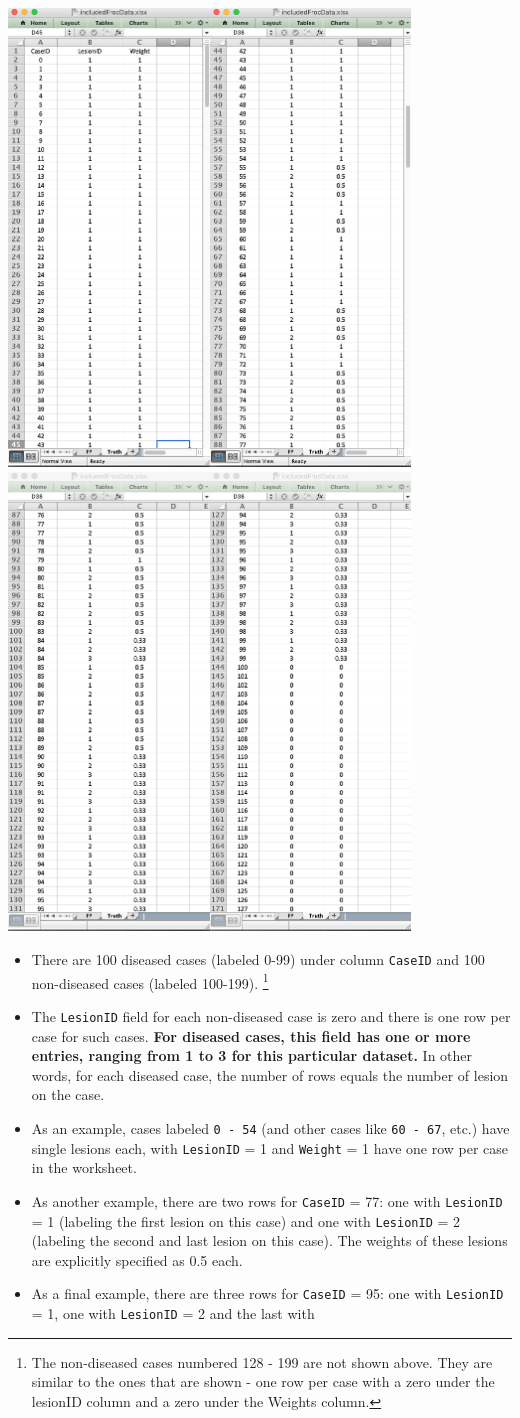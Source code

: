 \documentclass[]{book}
\providecommand{\tightlist}{%
  \setlength{\itemsep}{0pt}\setlength{\parskip}{0pt}}
\let\rmarkdownfootnote\footnote%
\def\footnote{\protect\rmarkdownfootnote}
\begin{document}
\includegraphics[width=0.4\textwidth,height=\textheight]{images/FROC-Truth-1.png}\includegraphics[width=0.4\textwidth,height=\textheight]{images/FROC-Truth-2.png}\includegraphics[width=0.4\textwidth,height=\textheight]{images/FROC-Truth-3.png}\includegraphics[width=0.4\textwidth,height=\textheight]{images/FROC-Truth-4.png}

\begin{itemize}
\tightlist
\item
  There are 100 diseased cases (labeled 0-99) under column \texttt{CaseID} and 100 non-diseased cases (labeled 100-199). \footnote{The non-diseased cases numbered 128 - 199 are not shown above. They are similar to the ones that are shown - one row per case with a zero under the lesionID column and a zero under the Weights column.}\\
\item
  The \texttt{LesionID} field for each non-diseased case is zero and there is one row per case for such cases. \textbf{For diseased cases, this field has one or more entries, ranging from 1 to 3 for this particular dataset.} In other words, for each diseased case, the number of rows equals the number of lesion on the case.
\item
  As an example, cases labeled \texttt{0\ -\ 54} (and other cases like \texttt{60\ -\ 67}, etc.) have single lesions each, with \texttt{LesionID} = 1 and \texttt{Weight} = 1 have one row per case in the worksheet.
\item
  As another example, there are two rows for \texttt{CaseID} = 77: one with \texttt{LesionID} = 1 (labeling the first lesion on this case) and one with \texttt{LesionID} = 2 (labeling the second and last lesion on this case). The weights of these lesions are explicitly specified as 0.5 each.
\item
  As a final example, there are three rows for \texttt{CaseID} = 95: one with \texttt{LesionID} = 1, one with \texttt{LesionID} = 2 and the last with 
\end{itemize}
\end{document}
